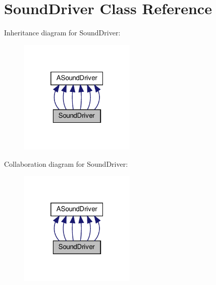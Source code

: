 \hypertarget{classSoundDriver}{}\section{Sound\+Driver Class Reference}
\label{classSoundDriver}


Inheritance diagram for Sound\+Driver\+:
\nopagebreak
\begin{figure}[H]
\begin{center}
\leavevmode
\includegraphics[width=157pt]{classSoundDriver__inherit__graph}
\end{center}
\end{figure}


Collaboration diagram for Sound\+Driver\+:
\nopagebreak
\begin{figure}[H]
\begin{center}
\leavevmode
\includegraphics[width=157pt]{classSoundDriver__coll__graph}
\end{center}
\end{figure}
